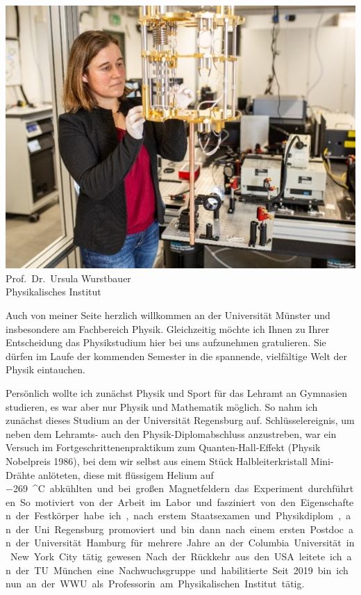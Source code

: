 \begin{multicols}{2}
\begin{center}
\includegraphics[width=0.8\columnwidth]{res/vorstellungsfotos/wurstbauer.jpg}\\
\smallskip
Prof.\ Dr.\ Ursula Wurstbauer\\
Physikalisches Institut
\end{center}

Auch von meiner Seite herzlich willkommen an der Universität Münster und insbesondere am Fachbereich Physik. Gleichzeitig möchte ich Ihnen zu Ihrer Entscheidung das Physikstudium hier bei uns aufzunehmen gratulieren. Sie dürfen im Laufe der kommenden Semester in die spannende, vielfältige Welt der Physik eintauchen.

Persönlich wollte ich zunächst Physik und Sport für das Lehramt an Gymnasien studieren, es war aber nur Physik und Mathematik möglich. So nahm ich zunächst dieses Studium an der Universität Regensburg auf. Schlüsselereignis, um neben dem Lehramts- auch den Physik-Diplomabschluss anzustreben, war ein Versuch im Fortgeschrittenenpraktikum zum Quanten-Hall-Effekt (Physik Nobelpreis 1986), bei dem wir selbst aus einem Stück Halbleiterkristall Mini-Drähte anlöteten, diese mit flüssigem Helium auf \SI{-269}{^\circ C} abkühlten und bei großen Magnetfeldern das Experiment durchführten. So motiviert von der Arbeit im Labor und fasziniert von den Eigenschaften der Festkörper habe ich, nach erstem Staatsexamen und Physikdiplom, an der Uni Regensburg promoviert und bin dann nach einem ersten Postdoc an der Universität Hamburg für mehrere Jahre an der Columbia Universität in New York City tätig gewesen. Nach der Rückkehr aus den USA leitete ich an der TU München eine Nachwuchsgruppe und habilitierte. Seit 2019 bin ich nun an der WWU als Professorin am Physikalischen Institut tätig. 


\end{multicols}
